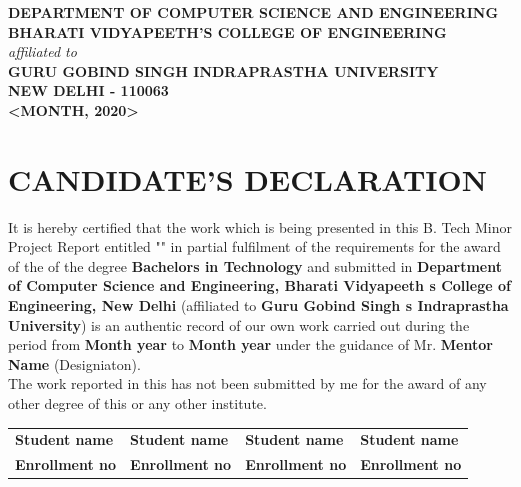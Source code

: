 \documentclass{article}
\begin{document}
\begin{titlepage}
\begin{center}
{            \textbf{
                DEPARTMENT OF COMPUTER SCIENCE AND ENGINEERING\\[.5cm]
                BHARATI VIDYAPEETH'S COLLEGE OF ENGINEERING\\[.5cm]
            }
            \textit{affiliated to}\\[.5cm]
            \textbf{
                GURU GOBIND SINGH INDRAPRASTHA UNIVERSITY\\[.5cm]
                NEW DELHI - 110063\\[1cm]
                <MONTH, 2020>
            }
        }

    \end{center}

\end{titlepage}




\chapter*{\centering \textbf{\Large CANDIDATE'S DECLARATION}}
\justify

     It is hereby certified that the work which is being presented in this B. Tech Minor Project Report entitled "\textbf{\thetitle}" in partial fulfilment of the requirements for the award of the of the degree \textbf{Bachelors in Technology} and submitted in \textbf{Department of Computer Science and Engineering, Bharati Vidyapeeth s College of Engineering, New Delhi} (affiliated to \textbf{Guru Gobind Singh s Indraprastha University}) is an authentic record of our own work carried out during the period from \textbf{Month year} to \textbf{Month year} under the guidance of Mr. \textbf{Mentor Name} (Designiaton).\\[.5cm]

     The work reported in this has not been submitted by me for the award of any other degree of this or any other institute.\\[1.5cm]
    
    \noindent
    \begin{tabularx}{\textwidth}{X X X X}
        \textbf{\small Student name} & \textbf{\small Student name} & \textbf{\small Student name} & \textbf{\small Student name} \\
        \textbf{\small Enrollment no} & \textbf{\small Enrollment no} & \textbf{\small Enrollment no} & \textbf{\small Enrollment no}
    \end{tabularx}\\[1cm]
    
\end{document}
